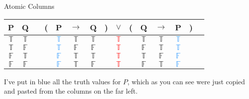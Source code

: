 \documentclass[
  ignorenonframetext,
]{beamer}
\renewcommand{\,}{\text{, }}
\def\True{\mathbb{T}}
\def\False{\mathbb{F}}
\begin{document}
\begin{frame}{Atomic Columns}
\protect\hypertarget{atomic-columns}{}
\begin{center}
\begin{tabular}{@{ }c@{ }@{ }c | c@{ }@{}c@{}@{ }c@{ }@{ }c@{ }@{ }c@{ }@{}c@{}@{ }c@{ }@{}c@{}@{ }c@{ }@{ }c@{ }@{ }c@{ }@{}c@{}@{ }c}
P & Q &  & ( & P & $\rightarrow$ & Q & ) & $\lor$ & ( & Q & $\rightarrow$ & P & ) & \\
\hline 
$\True$ & $\True$ &  &  & \textcolor{dodgerblue}{$\True$} & $\True$ & $\True$ &  & \textcolor{red}{$\True$} &  & $\True$ & $\True$ & \textcolor{dodgerblue}{$\True$} &  & \\
$\True$ & $\False$ &  &  & \textcolor{dodgerblue}{$\True$} & $\False$ & $\False$ &  & \textcolor{red}{$\True$} &  & $\False$ & $\True$ & \textcolor{dodgerblue}{$\True$} &  & \\
$\False$ & $\True$ &  &  & \textcolor{dodgerblue}{$\False$} & $\True$ & $\True$ &  & \textcolor{red}{$\True$} &  & $\True$ & $\False$ & \textcolor{dodgerblue}{$\False$} &  & \\
$\False$ & $\False$ &  &  & \textcolor{dodgerblue}{$\False$} & $\True$ & $\False$ &  & \textcolor{red}{$\True$} &  & $\False$ & $\True$ & \textcolor{dodgerblue}{$\False$} &  & \\
\end{tabular}

\end{center}

I've put in blue all the truth values for \(P\), which as you can see
were just copied and pasted from the columns on the far left.
\end{frame}
\end{document}
